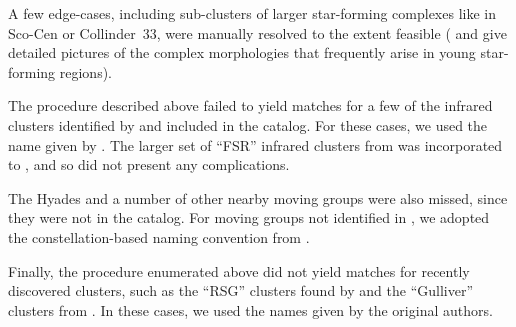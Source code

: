 \documentclass[12pt,twocolumn,tighten]{aastex62}
\begin{document}
A few edge-cases, including sub-clusters of larger
star-forming complexes like in Sco-Cen or Collinder~33, were 
manually resolved to the extent feasible (\citealt{rizzuto_multidimensional_2011}
and \citealt{saurin_isolating_2015} give
detailed pictures of the complex morphologies that frequently arise in
young star-forming regions).

The procedure described above failed to yield matches for a few of the
infrared clusters identified by \citet{majaess_discovering_2013} and
included in the \citet{dias_proper_2014} catalog.
For these cases, we used the name given by \citet{dias_proper_2014}.
The larger set of ``FSR'' infrared clusters from
\citet{froebrich_FSR_2007} was incorporated to
\citet{Kharchenko_et_al_2013}, and so did not present any
complications.

The Hyades and a number of other nearby moving groups were also
missed, since they were not in the \citet{Kharchenko_et_al_2013}
catalog.  For moving groups not identified in
\citet{Kharchenko_et_al_2013}, we adopted the constellation-based
naming convention from \citet{gagne_banyan_XI_2018}.  

Finally, the procedure enumerated above did not yield matches for
recently discovered clusters, such as the ``RSG'' clusters found by
\citet{roser_nine_RSG_2016} and the ``Gulliver'' clusters from
\citet{cantat-gaudin_gaia_2018}.  In these cases, we used the names
given by the original authors.
\end{document}
